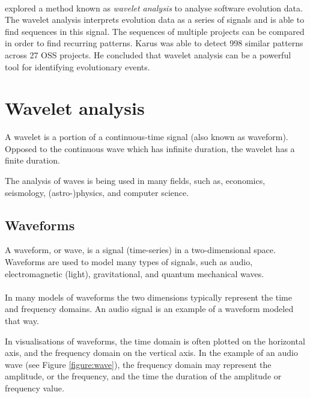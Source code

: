 \paragraph{}
\citet{karus2013} explored a method known as \emph{wavelet analysis }\rm to
analyse software evolution data. The wavelet analysis interprets evolution data
as a series of signals and is able to find sequences in this signal. The
sequences of multiple projects can be compared in order to find recurring
patterns. Karus was able to detect 998 similar patterns across 27 OSS projects.
He concluded that wavelet analysis can be a powerful tool for identifying
evolutionary events.





\section{Wavelet analysis}
\label{wavelet_analysis}
A wavelet is a portion of a continuous-time signal (also known as waveform).
Opposed to the continuous wave which has infinite duration, the wavelet has a
finite duration.

The analysis of waves is being used in many fields, such as, economics,
seismology, (astro-)physics, and computer science.

\subsection{Waveforms}
A waveform, or wave, is a signal (time-series) in a two-dimensional space.
Waveforms are used to model many types of signals, such as audio,
electromagnetic (light), gravitational, and quantum mechanical waves.

\paragraph{}
In many models of waveforms the two dimensions typically represent the time and
frequency domains. An audio signal is an example of a waveform modeled that way.

In visualisations of waveforms, the time domain is often plotted on the
horizontal axis, and the frequency domain on the vertical axis. In the example
of an audio wave (see Figure \ref{figure:wave}), the frequency domain may
represent the amplitude, or the frequency, and the time the duration of the
amplitude or frequency value.



